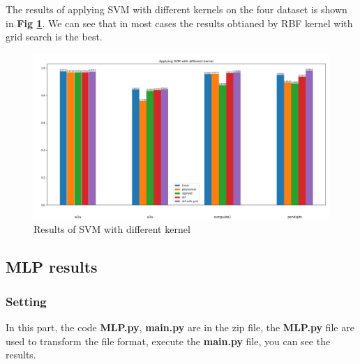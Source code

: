 \documentclass{article}
\theoremstyle{definition}
\numberwithin{equation}{section}
\numberwithin{figure}{section}
\begin{document}
 The results of applying SVM with different kernels on the four dataset is shown in \textbf{Fig \ref{kernel}}. We can see that in most cases the results obtianed by RBF kernel with grid search is the best.
 \begin{figure}[htbp]
  	\centering
  	\includegraphics[width=12cm]{fig/kernel.jpg}
  \caption{Results of SVM with different kernel}
  \label{kernel}
  \end{figure}
   
\subsection{MLP results}
\subsubsection{Setting}
In this part, the code \textbf{MLP.py}, \textbf{main.py} are in the zip file, the \textbf{MLP.py} file are used to transform the file format, execute the \textbf{main.py} file, you can see the results.
\end{document}
